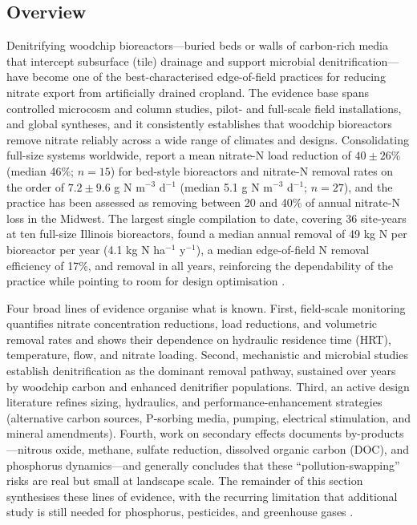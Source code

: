 \subsection{Overview}

Denitrifying woodchip bioreactors---buried beds or walls of carbon-rich media that intercept subsurface (tile) drainage and support microbial denitrification---have become one of the best-characterised edge-of-field practices for reducing nitrate export from artificially drained cropland. The evidence base spans controlled microcosm and column studies, pilot- and full-scale field installations, and global syntheses, and it consistently establishes that woodchip bioreactors remove nitrate reliably across a wide range of climates and designs. Consolidating full-size systems worldwide, \textcite{Christianson2021} report a mean nitrate-N load reduction of $40 \pm 26\%$ (median 46\%; $n=15$) for bed-style bioreactors and nitrate-N removal rates on the order of $7.2 \pm 9.6$ g N m$^{-3}$ d$^{-1}$ (median 5.1 g N m$^{-3}$ d$^{-1}$; $n=27$), and the practice has been assessed as removing between 20 and 40\% of annual nitrate-N loss in the Midwest. The largest single compilation to date, covering 36 site-years at ten full-size Illinois bioreactors, found a median annual removal of 49 kg N per bioreactor per year (4.1 kg N ha$^{-1}$ y$^{-1}$), a median edge-of-field N removal efficiency of 17\%, and removal in all years, reinforcing the dependability of the practice while pointing to room for design optimisation \parencite{Christianson2026}.

Four broad lines of evidence organise what is known. First, field-scale monitoring quantifies nitrate concentration reductions, load reductions, and volumetric removal rates and shows their dependence on hydraulic residence time (HRT), temperature, flow, and nitrate loading. Second, mechanistic and microbial studies establish denitrification as the dominant removal pathway, sustained over years by woodchip carbon and enhanced denitrifier populations. Third, an active design literature refines sizing, hydraulics, and performance-enhancement strategies (alternative carbon sources, P-sorbing media, pumping, electrical stimulation, and mineral amendments). Fourth, work on secondary effects documents by-products---nitrous oxide, methane, sulfate reduction, dissolved organic carbon (DOC), and phosphorus dynamics---and generally concludes that these ``pollution-swapping'' risks are real but small at landscape scale. The remainder of this section synthesises these lines of evidence, with the recurring limitation that additional study is still needed for phosphorus, pesticides, and greenhouse gases \parencite{Mitchell2023}.

